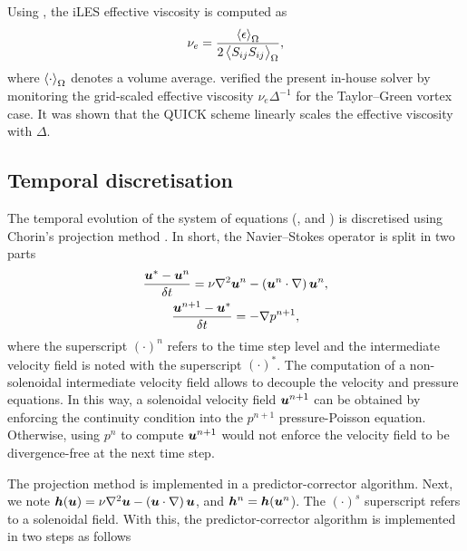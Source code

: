 \documentclass[../main.tex]{subfiles}
\begin{document}
Using , the iLES effective viscosity is computed as
\begin{equation}
\nu_e=\frac{\avg{\epsilon}_{\scaleto{\Omega}{5pt}}}{2\avg{S_{ij}S_{ij}}_{\scaleto{\Omega}{5pt}}},
\end{equation}
where $\avg{\cdot}_{\scaleto{\Omega}{5pt}}$ denotes a volume average.
\cite{Hendrickson2019} verified the present in-house solver by monitoring the grid-scaled effective viscosity $\nu_e\Delta^{-1}$ for the Taylor--Green vortex case.
It was shown that the QUICK scheme linearly scales the effective viscosity with $\Delta$.

\subsection{Temporal discretisation}

The temporal evolution of the system of equations (,  and ) is discretised using Chorin's projection method \citep{Chorin1967,Chorin1968}.
In short, the Navier--Stokes operator is split in two parts
\begin{gather}
\frac{\boldsymbol{u}^*-\boldsymbol{u}^n}{\delta t}=\nu\nabla^2\boldsymbol{u}^n-\left(\boldsymbol{u}^n\cdot\nabla \right)\boldsymbol{u}^n,\\
\frac{\boldsymbol{u}^{n+1}-\boldsymbol{u}^*}{\delta t}=-\nabla p^{n+1},
\end{gather}
where the superscript $(\cdot)^n$ refers to the time step level and the intermediate velocity field is noted with the superscript $(\cdot)^*$.
The computation of a non-solenoidal intermediate velocity field allows to decouple the velocity and pressure equations.
In this way, a solenoidal velocity field $\boldsymbol{u}^{n+1}$ can be obtained by enforcing the continuity condition into the $p^{n+1}$ pressure-Poisson equation.
Otherwise, using $p^{n}$ to compute $\boldsymbol{u}^{n+1}$ would not enforce the velocity field to be divergence-free at the next time step.

The projection method is implemented in a predictor-corrector algorithm.
Next, we note $\boldsymbol{h}(\boldsymbol{u})=\nu\nabla^2\boldsymbol{u}-\left(\boldsymbol{u}\cdot\nabla \right)\boldsymbol{u}$, and $\boldsymbol{h}^n=\boldsymbol{h}(\boldsymbol{u}^n$).
The $(\cdot)^s$ superscript refers to a solenoidal field.
With this, the predictor-corrector algorithm is implemented in two steps as follows
\end{document}

